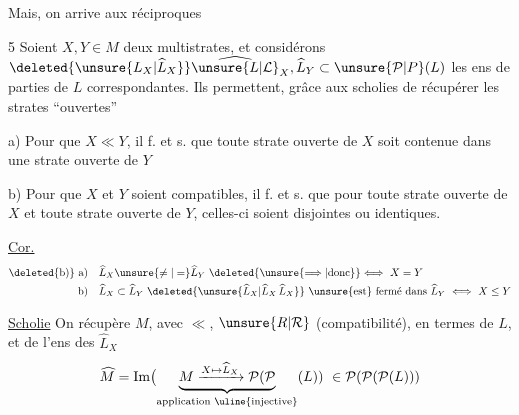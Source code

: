 Mais,  on arrive aux réciproques


\uline{} 5 Soient $X,Y\in M$ deux multistrates, et considérons $\deleted{\unsure{L_X|\widehat L_X}}\widehat{\unsure{L|\mathcal{L}}}_X,\widehat L_Y\subset\unsure{\mathcal P|P}(L)$ les ens de parties de $L$ correspondantes. Ils permettent, grâce aux scholies de récupérer les strates ``ouvertes''

a) Pour que $X\ll Y$, il f. et s. que  toute strate ouverte de $X$ soit contenue dans une strate ouverte de $Y$


b) Pour que $X$ et $Y$ soient compatibles, il f. et s. que pour toute strate ouverte de $X$ et toute strate ouverte de $Y$,  celles-ci soient disjointes ou identiques.

\uline{Cor.}
\[
\begin{aligned}
\text{\deleted{b)} a)}\quad &\widehat L_X\unsure{\ne|=}\widehat L_Y\ \deleted{\unsure{\Longrightarrow|\text{donc}}}\Longleftrightarrow\ X=Y\\
\text{b)}\quad &\widehat L_X\subset\widehat L_Y\ \deleted{\unsure{\widehat L_X|\widehat L_X\,\widehat L_X}}\ \text{\unsure{est} fermé dans }\widehat L_Y\ \Longleftrightarrow\ X\leq Y
\end{aligned}
\]

\uline{Scholie} On récupère $M$, avec $\ll$, $\unsure{R|\mathcal R}$ (compatibilité), en termes de $L$, et de l'ens  des $\widehat L_X$
\[
\widehat M=\operatorname{Im}\bigl(\underbrace{M\xrightarrow{X\mapsto\widehat L_X}\mathcal P(\mathcal P}_{\text{application \uline{injective}}}(L))\ \in\mathcal P(\mathcal P(\mathcal P(L)))
\]
